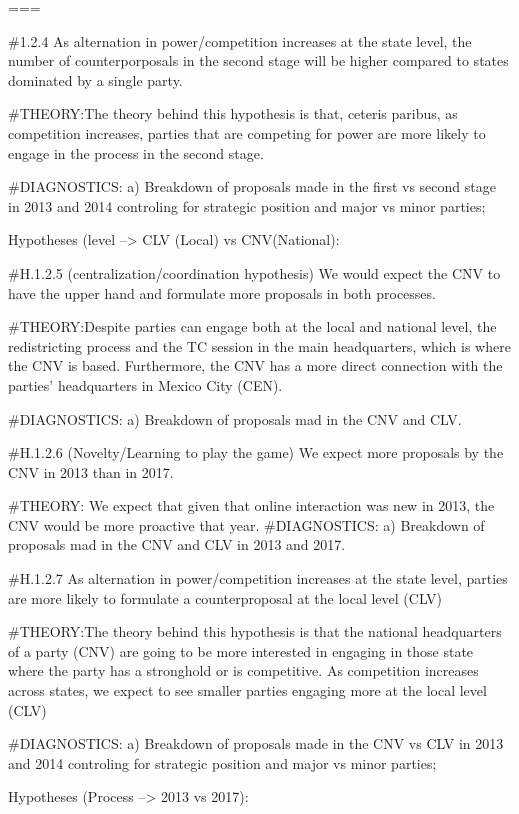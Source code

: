 \documentclass[
]{article}
\begin{document}
===

\#1.2.4 As alternation in power/competition increases at the state
level, the number of counterporposals in the second stage will be higher
compared to states dominated by a single party.

\#THEORY:The theory behind this hypothesis is that, ceteris paribus, as
competition increases, parties that are competing for power are more
likely to engage in the process in the second stage.

\#DIAGNOSTICS: a) Breakdown of proposals made in the first vs second
stage in 2013 and 2014 controling for strategic position and major vs
minor parties;

Hypotheses (level --\textgreater{} CLV (Local) vs CNV(National):

\#H.1.2.5 (centralization/coordination hypothesis) We would expect the
CNV to have the upper hand and formulate more proposals in both
processes.

\#THEORY:Despite parties can engage both at the local and national
level, the redistricting process and the TC session in the main
headquarters, which is where the CNV is based. Furthermore, the CNV has
a more direct connection with the parties' headquarters in Mexico City
(CEN).

\#DIAGNOSTICS: a) Breakdown of proposals mad in the CNV and CLV.

\#H.1.2.6 (Novelty/Learning to play the game) We expect more proposals
by the CNV in 2013 than in 2017.

\#THEORY: We expect that given that online interaction was new in 2013,
the CNV would be more proactive that year. \#DIAGNOSTICS: a) Breakdown
of proposals mad in the CNV and CLV in 2013 and 2017.

\#H.1.2.7 As alternation in power/competition increases at the state
level, parties are more likely to formulate a counterproposal at the
local level (CLV)

\#THEORY:The theory behind this hypothesis is that the national
headquarters of a party (CNV) are going to be more interested in
engaging in those state where the party has a stronghold or is
competitive. As competition increases across states, we expect to see
smaller parties engaging more at the local level (CLV)

\#DIAGNOSTICS: a) Breakdown of proposals made in the CNV vs CLV in 2013
and 2014 controling for strategic position and major vs minor parties;

Hypotheses (Process --\textgreater{} 2013 vs 2017):
\end{document}
